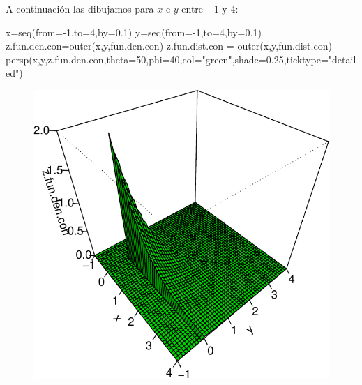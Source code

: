 \documentclass[
  letterpaper,
  DIV=11,
  numbers=noendperiod]{scrreprt}
\newenvironment{Shaded}{\begin{snugshade}}{\end{snugshade}}
\newcommand{\AttributeTok}[1]{\textcolor[rgb]{0.40,0.45,0.13}{#1}}
\newcommand{\DecValTok}[1]{\textcolor[rgb]{0.68,0.00,0.00}{#1}}
\newcommand{\FloatTok}[1]{\textcolor[rgb]{0.68,0.00,0.00}{#1}}
\newcommand{\FunctionTok}[1]{\textcolor[rgb]{0.28,0.35,0.67}{#1}}
\newcommand{\NormalTok}[1]{\textcolor[rgb]{0.00,0.23,0.31}{#1}}
\newcommand{\OtherTok}[1]{\textcolor[rgb]{0.00,0.23,0.31}{#1}}
\newcommand{\SpecialCharTok}[1]{\textcolor[rgb]{0.37,0.37,0.37}{#1}}
\newcommand{\StringTok}[1]{\textcolor[rgb]{0.13,0.47,0.30}{#1}}
\begin{document}
A continuación las dibujamos para \(x\) e \(y\) entre \(-1\) y \(4\):

\begin{Shaded}
\begin{Highlighting}[]
\NormalTok{x}\OtherTok{=}\FunctionTok{seq}\NormalTok{(}\AttributeTok{from=}\SpecialCharTok{{-}}\DecValTok{1}\NormalTok{,}\AttributeTok{to=}\DecValTok{4}\NormalTok{,}\AttributeTok{by=}\FloatTok{0.1}\NormalTok{)}
\NormalTok{y}\OtherTok{=}\FunctionTok{seq}\NormalTok{(}\AttributeTok{from=}\SpecialCharTok{{-}}\DecValTok{1}\NormalTok{,}\AttributeTok{to=}\DecValTok{4}\NormalTok{,}\AttributeTok{by=}\FloatTok{0.1}\NormalTok{)}
\NormalTok{z.fun.den.con}\OtherTok{=}\FunctionTok{outer}\NormalTok{(x,y,fun.den.con)}
\NormalTok{z.fun.dist.con }\OtherTok{=} \FunctionTok{outer}\NormalTok{(x,y,fun.dist.con)}
\FunctionTok{persp}\NormalTok{(x,y,z.fun.den.con,}\AttributeTok{theta=}\DecValTok{50}\NormalTok{,}\AttributeTok{phi=}\DecValTok{40}\NormalTok{,}\AttributeTok{col=}\StringTok{"green"}\NormalTok{,}\AttributeTok{shade=}\FloatTok{0.25}\NormalTok{,}\AttributeTok{ticktype=}\StringTok{"detailed"}\NormalTok{)}
\end{Highlighting}
\end{Shaded}

\begin{figure}[H]

{\centering \includegraphics{5_files/figure-pdf/unnamed-chunk-14-1.pdf}

}

\end{figure}
\end{document}
